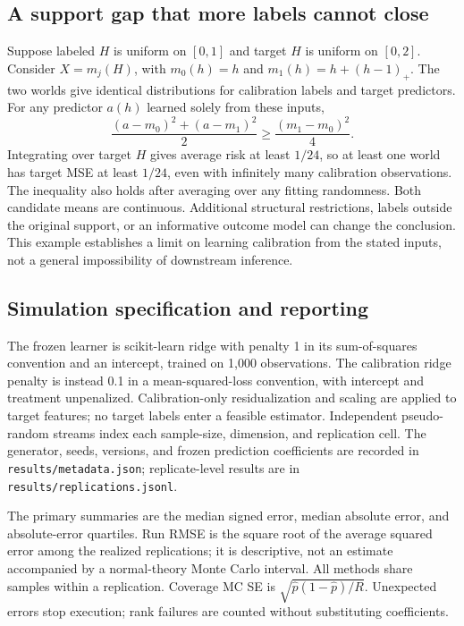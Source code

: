 \documentclass[11pt]{article}
\begin{document}
\subsection{A support gap that more labels cannot close}
Suppose labeled $H$ is uniform on $[0,1]$ and target $H$ is uniform on $[0,2]$. Consider $X=m_j(H)$, with $m_0(h)=h$ and $m_1(h)=h+(h-1)_+$. The two worlds give identical distributions for calibration labels and target predictors. For any predictor $a(h)$ learned solely from these inputs,
\begin{equation}
\frac{(a-m_0)^2+(a-m_1)^2}{2}
\geq\frac{(m_1-m_0)^2}{4}.
\end{equation}
Integrating over target $H$ gives average risk at least $1/24$, so at least one world has target MSE at least $1/24$, even with infinitely many calibration observations. The inequality also holds after averaging over any fitting randomness. Both candidate means are continuous. Additional structural restrictions, labels outside the original support, or an informative outcome model can change the conclusion. This example establishes a limit on learning calibration from the stated inputs, not a general impossibility of downstream inference.

\subsection{Simulation specification and reporting}
The frozen learner is scikit-learn ridge with penalty 1 in its sum-of-squares convention and an intercept, trained on 1,000 observations. The calibration ridge penalty is instead 0.1 in a mean-squared-loss convention, with intercept and treatment unpenalized. Calibration-only residualization and scaling are applied to target features; no target labels enter a feasible estimator. Independent pseudo-random streams index each sample-size, dimension, and replication cell. The generator, seeds, versions, and frozen prediction coefficients are recorded in \texttt{results/metadata.json}; replicate-level results are in \texttt{results/replications.jsonl}.

The primary summaries are the median signed error, median absolute error, and absolute-error quartiles. Run RMSE is the square root of the average squared error among the realized replications; it is descriptive, not an estimate accompanied by a normal-theory Monte Carlo interval. All methods share samples within a replication. Coverage MC SE is $\sqrt{\widehat p(1-\widehat p)/R}$. Unexpected errors stop execution; rank failures are counted without substituting coefficients.
\end{document}
